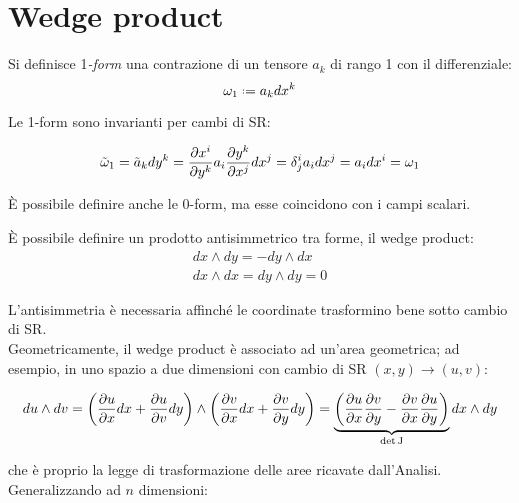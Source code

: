
\section{Wedge product}\label{sec-wp}

\begin{definition}
	Si definisce 1\textit{-form} una contrazione di un tensore $ a_k $ di rango 1 con il differenziale:
	\begin{equation}
		\omega_1 \defeq a_k dx^k
		\label{eq:3.1}
	\end{equation}
\end{definition}

Le 1-form sono invarianti per cambi di SR:

\begin{equation}
	\tilde{\omega}_1 = \tilde{a}_k dy^k = \frac{\partial x^i}{\partial y^k} a_i \frac{\partial y^k}{\partial x^j} dx^j = \delta^i_j a_i dx^j = a_i dx^i = \omega_1
	\label{eq:3.2}
\end{equation}

È possibile definire anche le 0-form, ma esse coincidono con i campi scalari.

È possibile definire un prodotto antisimmetrico tra forme, il wedge product:
\begin{equation}
	\begin{split}
		dx \wedge dy = - dy \wedge dx \\
		dx \wedge dx = dy \wedge dy = 0
	\end{split}
	\label{eq:3.3}
\end{equation}

L'antisimmetria è necessaria affinché le coordinate trasformino bene sotto cambio di SR.\\
Geometricamente, il wedge product è associato ad un'area geometrica; ad esempio, in uno spazio a due dimensioni con cambio di SR $ (x,y) \rightarrow (u,v) $:

\begin{equation}
	du \wedge dv = \left( \frac{\partial u}{\partial x} dx + \frac{\partial u}{\partial v} dy \right) \wedge \left( \frac{\partial v}{\partial x} dx + \frac{\partial v}{\partial y} dy \right) = \underbrace{\left( \frac{\partial u}{\partial x} \frac{\partial v}{\partial y} - \frac{\partial v}{\partial x} \frac{\partial u}{\partial y} \right)}_{\det\mathbf{\text{J}}} dx \wedge dy
	\label{eq:3.4}
\end{equation}

che è proprio la legge di trasformazione delle aree ricavate dall'Analisi.\\
Generalizzando ad $ n $ dimensioni:

